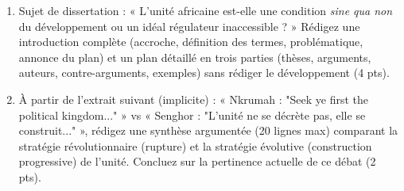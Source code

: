 \documentclass[11pt]{article}
\begin{document}
\begin{exercice}
\begin{enumerate}
    \item Sujet de dissertation : « L'unité africaine est-elle une condition \textit{sine qua non} du développement ou un idéal régulateur inaccessible ? »
    Rédigez une introduction complète (accroche, définition des termes, problématique, annonce du plan) et un plan détaillé en trois parties (thèses, arguments, auteurs, contre-arguments, exemples) sans rédiger le développement (4 pts).
    \item À partir de l'extrait suivant (implicite) : « Nkrumah : "Seek ye first the political kingdom..." » vs « Senghor : "L'unité ne se décrète pas, elle se construit..." », rédigez une synthèse argumentée (20 lignes max) comparant la stratégie révolutionnaire (rupture) et la stratégie évolutive (construction progressive) de l'unité. Concluez sur la pertinence actuelle de ce débat (2 pts).
\end{enumerate}
\end{exercice}
\end{document}
